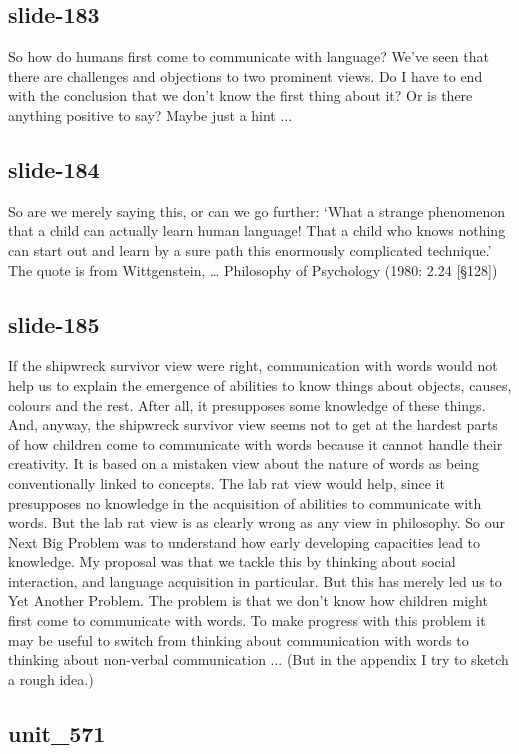\documentclass[12pt,\papersize]{extarticle}
\begin{document}
 
\subsection{slide-183}
So how do humans first come to communicate with language?
We've seen that there are challenges and objections to two prominent views.
Do I have to end with the conclusion that we don't know the first thing about it?
Or is there anything positive to say?
Maybe just a hint ...
 
 
\subsection{slide-184}
So are we merely saying this, or can we go further:
‘What a strange phenomenon that a child can actually learn human language! That a child who knows nothing can start out and learn by a sure path this enormously complicated technique.’
The quote is from Wittgenstein, … Philosophy of Psychology (1980: 2.24 [§128])
 
 
\subsection{slide-185}
If the shipwreck survivor view were right, communication with words would not help us to explain the emergence of abilities to know things about objects, causes, colours and the rest. After all, it presupposes some knowledge of these things. And, anyway, the shipwreck survivor view seems not to get at the hardest parts of how children come to communicate with words because it cannot handle their creativity. It is based on a mistaken view about the nature of words as being conventionally linked to concepts.
The lab rat view would help, since it presupposes no knowledge in the acquisition of abilities to communicate with words. But the lab rat view is as clearly wrong as any view in philosophy.
So our Next Big Problem was to understand how early developing capacities lead to knowledge. My proposal was that we tackle this by thinking about social interaction, and language acquisition in particular. But this has merely led us to Yet Another Problem.
The problem is that we don't know how children might first come to communicate with words.
To make progress with this problem it may be useful to switch from thinking about communication with words to thinking about non-verbal communication ... (But in the appendix I try to sketch a rough idea.)
 
 
\subsection{unit\_571}
 
\end{document}
